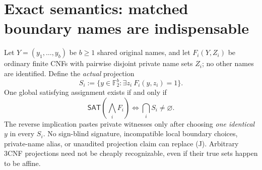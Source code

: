 \documentclass[11pt]{article}
\newcommand{\SAT}{\mathsf{SAT}}
\newcommand{\Ftwo}{\mathbb F_2}
\begin{document}
\section{Exact semantics: matched boundary names are indispensable}
Let $Y=(y_1,\ldots,y_b)$ be $b\ge1$ shared original names, and let $F_i(Y,Z_i)$ be ordinary finite CNFs with pairwise disjoint private name sets $Z_i$; no other names are identified. Define the \emph{actual} projection
\[
S_i:=\{y\in\Ftwo^b:\exists z_i\ F_i(y,z_i)=1\}.
\]
One global satisfying assignment exists if and only if
\begin{equation}
\SAT\left(\bigwedge_i F_i\right)\iff \bigcap_i S_i\ne\varnothing. \tag{J}
\end{equation}
The reverse implication pastes private witnesses only after choosing \emph{one identical} $y$ in every $S_i$. No sign-blind signature, incompatible local boundary choices, private-name alias, or unaudited projection claim can replace (J). Arbitrary 3CNF projections need not be cheaply recognizable, even if their true sets happen to be affine.
\end{document}

